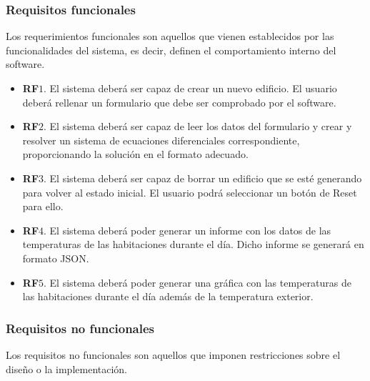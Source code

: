 \subsubsection{Requisitos funcionales}
Los requerimientos funcionales son aquellos que vienen establecidos por las funcionalidades del sistema, es decir, definen el comportamiento interno del software.
\begin{itemize}
	\item \textbf{RF$1$}. El sistema deberá ser capaz de crear un nuevo edificio. El  usuario deberá rellenar un formulario que debe ser comprobado por el software.
	\item \textbf{RF$2$}. El sistema deberá ser capaz de leer los datos del formulario y crear y resolver un sistema de ecuaciones diferenciales correspondiente, proporcionando la solución en el formato adecuado.
	\item \textbf{RF$3$}. El sistema deberá ser capaz de borrar un edificio que se esté generando para volver al estado inicial. El  usuario podrá seleccionar un botón de Reset para ello.
	\item \textbf{RF$4$}. El sistema deberá poder generar un informe con los datos de las temperaturas de las habitaciones durante el día. Dicho informe se generará en formato JSON.
	\item \textbf{RF$5$}. El sistema deberá poder generar una gráfica con las temperaturas de las habitaciones durante el día además de la temperatura exterior.
\end{itemize}
\subsubsection{Requisitos no funcionales}
Los requisitos no funcionales son aquellos que imponen restricciones sobre el diseño o la implementación.\\

